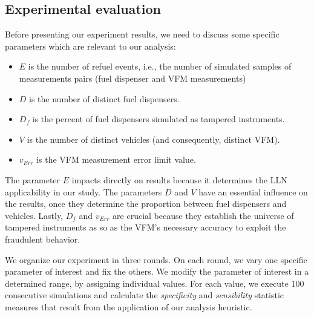 \documentclass[sigplan]{acmart}
\begin{document}

\subsection{Experimental evaluation}
Before presenting our experiment results, we need to discuss some specific parameters which are relevant to our analysis:
\begin{itemize}
    \item $E$ is the number of refuel events, i.e., the number of simulated samples of measurements pairs (fuel dispenser and VFM measurements)
    \item $D$ is the number of distinct fuel dispensers.
    \item $D_f$ is the percent of fuel dispensers simulated as tampered instruments.
    \item $V$ is the number of distinct vehicles (and consequently, distinct VFM).
    \item $v_{Err}$ is the VFM measurement error limit value.
\end{itemize}

The parameter $E$ impacts directly on results because it determines the LLN applicability in our study.
The parameters $D$ and $V$ have an essential influence on the results, once they determine the proportion between fuel dispensers and vehicles.
Lastly, $D_f$ and $v_{Err}$ are crucial because they establish the universe of tampered instruments as so as the VFM's necessary accuracy to exploit the fraudulent behavior.

We organize our experiment in three rounds.
On each round, we vary one specific parameter of interest and fix the others.
We modify the parameter of interest in a determined range, by assigning individual values.
For each value, we execute 100 consecutive simulations and calculate the \emph{specificity} and \emph{sensibility} statistic measures that result from the application of our analysis heuristic.
\end{document}
